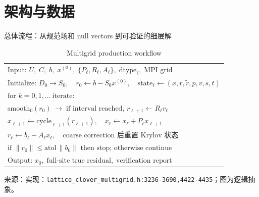 \documentclass[UTF8,aspectratio=169,11pt]{ctexbeamer}
\newcommand{\source}[1]{%
  \vspace{0.06em}\par{\raggedright\scriptsize\color{muted}来源：#1\par}}
\newcommand{\code}[1]{\nolinkurl{#1}}
\begin{document}
\section{架构与数据}

\begin{frame}[t]{总体流程：从规范场和 null vectors 到可验证的细层解}
  \begin{center}
  \end{center}
  \vspace{-0.18em}
  \begin{table}[htbp]
    \centering
    \caption*{Multigrid production workflow}
    \footnotesize
    \renewcommand{\arraystretch}{0.78}
    \begin{tabular}{@{}l@{}}
      $\text{Input: } U,\;C,\;b,\;x^{(0)},\;\{P_\ell,R_\ell,A_\ell\},\;\text{dtype}_\ell,\;\text{MPI grid}$ \\
      $\text{Initialize: } D_0\to S_0,\quad r_0\gets b-S_0x^{(0)},\quad \text{state}_\ell\gets(x,r,\tilde r,p,v,s,t)$ \\
      $\text{for } k=0,1,\ldots\ \text{iterate:}$ \\
      \quad $\text{smooth}_{0}(r_0)\;\to\;\text{if interval reached, }r_{\ell+1}\gets R_\ell r_\ell$ \\
      \quad $x_{\ell+1}\gets\text{cycle}_{\ell+1}(r_{\ell+1}),\quad x_\ell\gets x_\ell+P_\ell x_{\ell+1}$ \\
      \quad $r_\ell\gets b_\ell-A_\ell x_\ell,\quad\text{coarse correction 后重置 Krylov 状态}$ \\
      $\text{if }\|r_0\|\le\mathrm{atol}\,\|b_0\|\text{ then stop; otherwise continue}$ \\
      $\text{Output: }x_0,\;\text{full-site true residual},\;\text{verification report}$
    \end{tabular}
  \end{table}
  \source{实现：\code{lattice_clover_multigrid.h:3236-3690,4422-4435}；图为逻辑抽象。}
\end{frame}
\end{document}
